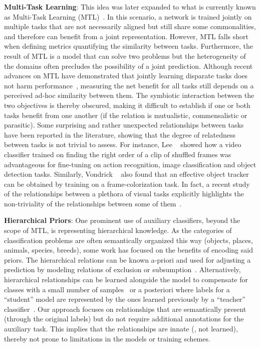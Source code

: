 \documentclass[10pt,twocolumn,letterpaper]{article}
\begin{document}
\textbf{Multi-Task Learning}: This idea was later expanded to what is currently known as Multi-Task Learning (MTL)~\cite{caruana1997multitask}.
In this scenario, a network is trained jointly on multiple tasks that are not necessarily aligned but still share some commonalities, and therefore can benefit from a joint representation.
However, MTL falls short when defining metrics quantifying the similarity between tasks.
Furthermore, the result of MTL is a model that can solve two problems but the heterogeneity of the domains often precludes the possibility of a joint prediction.
Although recent advances on MTL have demonstrated that jointly learning disparate tasks does not harm performance~\cite{kaiser2017one}, measuring the net benefit for all tasks still depends on a perceived ad-hoc similarity between them.
The symbiotic interaction between the two objectives is thereby obscured, making it difficult to establish if one or both tasks benefit from one another (\ie if the relation is mutualistic, commensalistic or parasitic).
Some surprising and rather unexpected relationships between tasks have been reported in the literature, showing that the degree of relatedness between tasks is not trivial to assess.
For instance, Lee \etal~\cite{lee2017unsupervised} showed how a video classifier trained on finding the right order of a clip of shuffled frames was advantageous for fine-tuning on action recognition, image classification and object detection tasks.
Similarly, Vondrick \etal~\cite{vondrick2018tracking} also found that an effective object tracker can be obtained by training on a frame-colorization task.
In fact, a recent study of the relationships between a plethora of visual tasks explicitly highlights the non-triviality of the relationships between some of them~\cite{zamir2018taskonomy}.

\textbf{Hierarchical Priors}: One prominent use of auxiliary classifiers, beyond the scope of MTL, is representing hierarchical knowledge.
As the categories of classification problems are often semantically organized this way (\eg objects, places, animals, species, breeds), some work has focused on the benefits of encoding said priors.
The hierarchical relations can be known a-priori and used for adjusting a prediction by modeling relations of exclusion or subsumption~\cite{deng2014largescale}.
Alternatively, hierarchical relationships can be learned alongside the model to compensate for classes with a small number of samples~\cite{srivastava2013discriminative} or a posteriori where labels for a ``student'' model are represented by the ones learned previously by a ``teacher'' classifier~\cite{hinton2015distilling}.
Our approach focuses on relationships that are semantically present (through the original labels) but do not require additional annotations for the auxiliary task.
This implies that the relationships are innate (\ie, not learned), thereby not prone to limitations in the models or training schemes.
\end{document}
